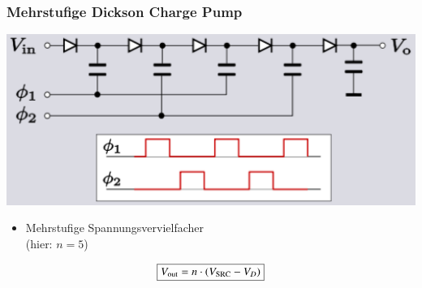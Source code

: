 \subsubsection{Mehrstufige Dickson Charge Pump}

\begin{minipage}[c]{0.5\columnwidth}
    \includegraphics[width=\columnwidth]{images/dickson_charge_pump_mehrstufig.png}
\end{minipage}
\hfill
\begin{minipage}[c]{0.48\columnwidth}
    \begin{itemize}
        \item Mehrstufige Spannungsvervielfacher\\
            (hier: $n = 5$)
    \end{itemize}

    $$ \boxed{ V_{\rm out} = n \cdot (V_{\rm SRC} - V_D) } $$
\end{minipage}

